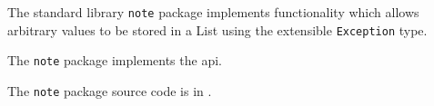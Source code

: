 
The standard library {\tt note} package implements functionality 
which allows arbitrary values to be stored in a List using the 
extensible {\tt Exception} type.

The {\tt note} package implements the  api.

The {\tt note} package source code is in .

